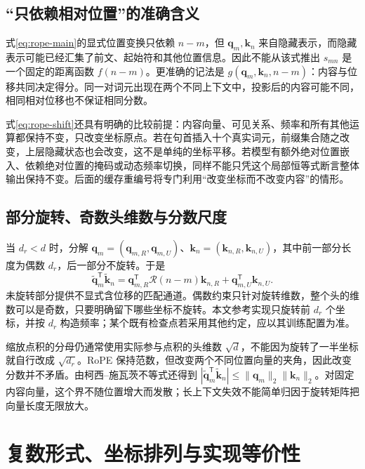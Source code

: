 \documentclass[UTF8,12pt,a4paper,fontset=fandol]{ctexart}
\begin{document}
\subsection{“只依赖相对位置”的准确含义}
式\eqref{eq:rope-main}的显式位置变换只依赖 $n-m$，但 $\mathbf q_m,\mathbf k_n$ 来自隐藏表示，而隐藏表示可能已经汇集了前文、起始符和其他位置信息。因此不能从该式推出 $s_{mn}$ 是一个固定的距离函数 $f(n-m)$。更准确的记法是 $g(\mathbf q_m,\mathbf k_n,n-m)$：内容与位移共同决定得分。同一对词元出现在两个不同上下文中，投影后的内容可能不同，相同相对位移也不保证相同分数。

式\eqref{eq:rope-shift}还具有明确的比较前提：内容向量、可见关系、频率和所有其他运算都保持不变，只改变坐标原点。若在句首插入十个真实词元，前缀集合随之改变，上层隐藏状态也会改变，这不是单纯的坐标平移。若模型有额外绝对位置嵌入、依赖绝对位置的掩码或动态频率切换，同样不能只凭这个局部恒等式断言整体输出保持不变。后面的缓存重编号将专门利用“改变坐标而不改变内容”的情形。

\subsection{部分旋转、奇数头维数与分数尺度}
当 $d_r<d$ 时，分解 $\mathbf q_m=(\mathbf q_{m,R},\mathbf q_{m,U})$、$\mathbf k_n=(\mathbf k_{n,R},\mathbf k_{n,U})$，其中前一部分长度为偶数 $d_r$，后一部分不旋转。于是
\begin{equation}
\widetilde{\mathbf q}_m^{\mathsf T}\widetilde{\mathbf k}_n
=\mathbf q_{m,R}^{\mathsf T}\mathcal R(n-m)\mathbf k_{n,R}
+\mathbf q_{m,U}^{\mathsf T}\mathbf k_{n,U}.
\label{eq:rope-partial}
\end{equation}
未旋转部分提供不显式含位移的匹配通道。偶数约束只针对旋转维数，整个头的维数可以是奇数，只要明确留下哪些坐标不旋转。本文参考实现只旋转前 $d_r$ 个坐标，并按 $d_r$ 构造频率；某个既有检查点若采用其他约定，应以其训练配置为准。

缩放点积的分母仍通常使用实际参与点积的头维数 $\sqrt d$，不能因为旋转了一半坐标就自行改成 $\sqrt{d_r}$。RoPE 保持范数，但改变两个不同位置向量的夹角，因此改变分数并不矛盾。由柯西--施瓦茨不等式还得到 $|\widetilde{\mathbf q}_m^{\mathsf T}\widetilde{\mathbf k}_n|\leq\|\mathbf q_m\|_2\|\mathbf k_n\|_2$。对固定内容向量，这个界不随位置增大而发散；长上下文失效不能简单归因于旋转矩阵把向量长度无限放大。

\section{复数形式、坐标排列与实现等价性}
\label{sec:rope-complex}
\end{document}
